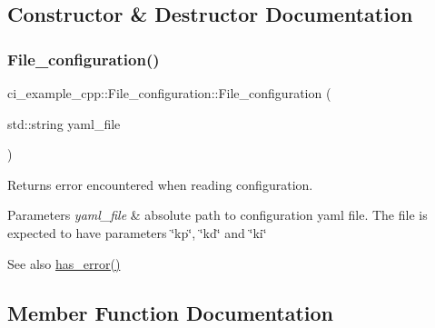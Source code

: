 \subsection{Constructor \& Destructor Documentation}
\mbox{\label{classci__example__cpp_1_1File__configuration_a9eb17de315392f3f755a327af4beb5d7}} 
\subsubsection{\texorpdfstring{File\+\_\+configuration()}{File\_configuration()}}
{\footnotesize\ttfamily ci\+\_\+example\+\_\+cpp\+::\+File\+\_\+configuration\+::\+File\+\_\+configuration (\begin{DoxyParamCaption}\item[{std\+::string}]{yaml\+\_\+file }\end{DoxyParamCaption})}



Returns error encountered when reading configuration. 


\begin{DoxyParams}{Parameters}
{\em yaml\+\_\+file} & absolute path to configuration yaml file. The file is expected to have parameters \char`\"{}kp\char`\"{}, \char`\"{}kd\char`\"{} and \char`\"{}ki\char`\"{} \\
\hline
\end{DoxyParams}
\begin{DoxySeeAlso}{See also}
\hyperlink{classci__example__cpp_1_1File__configuration_aa3cae137be3b59e61d13c2a9b1ec8b6a}{has\+\_\+error()} 
\end{DoxySeeAlso}


\subsection{Member Function Documentation}
\mbox{\label{classci__example__cpp_1_1File__configuration_aaf67f7d61d467563a4dce8aa69306a6a}} 
